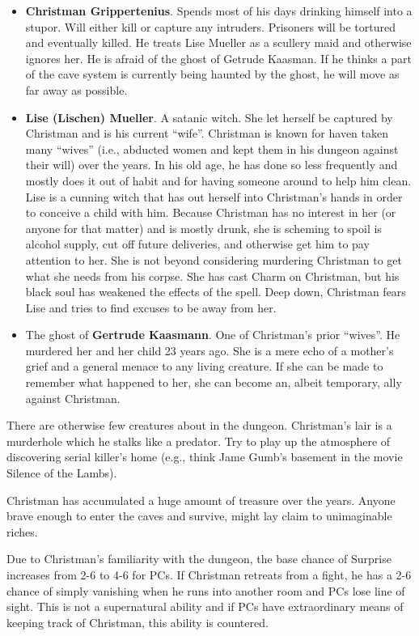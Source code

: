 \documentclass[
]{book}
\begin{document}
\begin{itemize}
\item
  \textbf{Christman Grippertenius}. Spends most of his days drinking himself into a stupor. Will either kill or capture any intruders. Prisoners will be tortured and eventually killed. He treats Lise Mueller as a scullery maid and otherwise ignores her. He is afraid of the ghost of Getrude Kaasman. If he thinks a part of the cave system is currently being haunted by the ghost, he will move as far away as possible.
\item
  \textbf{Lise (Lischen) Mueller}. A satanic witch. She let herself be captured by Christman and is his current ``wife''. Christman is known for haven taken many ``wives'' (i.e., abducted women and kept them in his dungeon against their will) over the years. In his old age, he has done so less frequently and mostly does it out of habit and for having someone around to help him clean. Lise is a cunning witch that has out herself into Christman's hands in order to conceive a child with him. Because Christman has no interest in her (or anyone for that matter) and is mostly drunk, she is scheming to spoil is alcohol supply, cut off future deliveries, and otherwise get him to pay attention to her. She is not beyond considering murdering Christman to get what she needs from his corpse. She has cast Charm on Christman, but his black soul has weakened the effects of the spell. Deep down, Christman fears Lise and tries to find excuses to be away from her.
\item
  The ghost of \textbf{Gertrude Kaasmann}. One of Christman's prior ``wives''. He murdered her and her child 23 years ago. She is a mere echo of a mother's grief and a general menace to any living creature. If she can be made to remember what happened to her, she can become an, albeit temporary, ally against Christman.
\end{itemize}

There are otherwise few creatures about in the dungeon. Christman's lair is a murderhole which he stalks like a predator. Try to play up the atmosphere of discovering serial killer's home (e.g., think Jame Gumb's basement in the movie Silence of the Lambs).

Christman has accumulated a huge amount of treasure over the years. Anyone brave enough to enter the caves and survive, might lay claim to unimaginable riches.

Due to Christman's familiarity with the dungeon, the base chance of Surprise increases from 2-6 to 4-6 for PCs. If Christman retreats from a fight, he has a 2-6 chance of simply vanishing when he runs into another room and PCs lose line of sight. This is not a supernatural ability and if PCs have extraordinary means of keeping track of Christman, this ability is countered.
\end{document}
